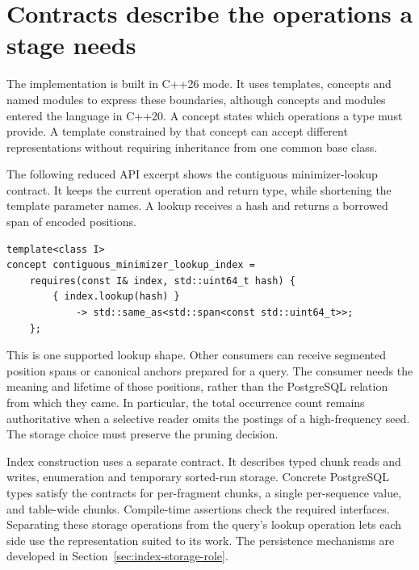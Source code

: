 \section{Contracts describe the operations a stage needs}
\label{sec:arch-operation-contracts}

The implementation is built in C++26 mode. It uses templates, concepts and
named modules to express these boundaries, although concepts and modules
entered the language in C++20. A concept states which operations a type must
provide. A template constrained by that concept can accept different
representations without requiring inheritance from one common base class.

The following reduced API excerpt shows the contiguous minimizer-lookup
contract. It keeps the current operation and return type, while shortening
the template parameter names. A lookup receives a hash and returns a borrowed
span of encoded positions.

\noindent\begin{minipage}{\linewidth}
\begin{lstlisting}[style=bioseq-cpp26,numbers=none,
  basicstyle=\footnotesize\ttfamily,
  caption={The contiguous lookup API constrains the operation visible to a consumer.},
  label={lst:arch-lookup-contract}]
template<class I>
concept contiguous_minimizer_lookup_index =
    requires(const I& index, std::uint64_t hash) {
        { index.lookup(hash) }
            -> std::same_as<std::span<const std::uint64_t>>;
    };
\end{lstlisting}
\end{minipage}

This is one supported lookup shape. Other consumers can receive segmented
position spans or canonical anchors prepared for a query. The consumer needs
the meaning and lifetime of those positions, rather than the PostgreSQL
relation from which they came. In particular, the total occurrence count
remains authoritative when a selective reader omits the postings of a
high-frequency seed. The storage choice must preserve the pruning decision.

Index construction uses a separate contract. It describes typed chunk reads
and writes, enumeration and temporary sorted-run storage. Concrete
PostgreSQL types satisfy the contracts for per-fragment chunks, a single
per-sequence value, and table-wide chunks. Compile-time assertions check the
required interfaces. Separating these storage operations from the query's
lookup operation lets each side use the representation suited to its work.
The persistence mechanisms are developed in
Section~\ref{sec:index-storage-role}.

